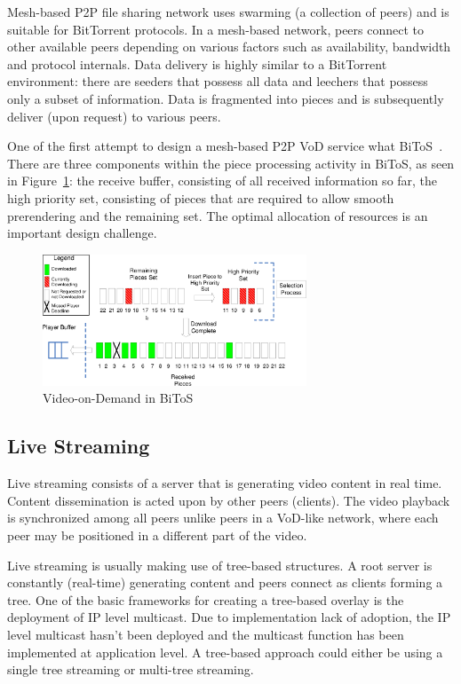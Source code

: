 Mesh-based P2P file sharing network uses swarming (a collection of peers) and
is suitable for BitTorrent protocols. In a mesh-based network, peers connect
to other available peers depending on various factors such as availability,
bandwidth and protocol internals. Data delivery is highly similar to a
BitTorrent environment: there are seeders that possess all data and leechers
that possess only a subset of information. Data is fragmented into pieces and
is subsequently deliver (upon request) to various peers.

One of the first attempt to design a mesh-based P2P VoD service what
BiToS~\cite{bitos}. There are three components within the piece processing
activity in BiToS, as seen in Figure~\ref{fig:p2p-systems:bitos-vod}: the receive buffer, consisting of
all received information so far, the high priority set, consisting of pieces
that are required to allow smooth prerendering and the remaining set. The
optimal allocation of resources is an important design challenge.

\begin{figure}
  \centering
  \includegraphics[width=0.7\textwidth]{src/img/p2p-systems/bitos-vod}
  \caption{Video-on-Demand in BiToS}
  \label{fig:p2p-systems:bitos-vod}
\end{figure}

\subsection{Live Streaming}
\label{subsec:p2p-systems:ls}

Live streaming consists of a server that is generating video content in real
time. Content dissemination is acted upon by other peers (clients). The video
playback is synchronized among all peers unlike peers in a VoD-like network,
where each peer may be positioned in a different part of the video.

Live streaming is usually making use of tree-based structures. A root server
is constantly (real-time) generating content and peers connect as clients
forming a tree. One of the basic frameworks for creating a tree-based overlay
is the deployment of IP level multicast. Due to implementation lack of
adoption, the IP level multicast hasn't been deployed and the multicast
function has been implemented at application level. A tree-based approach
could either be using a single tree streaming or multi-tree streaming.

